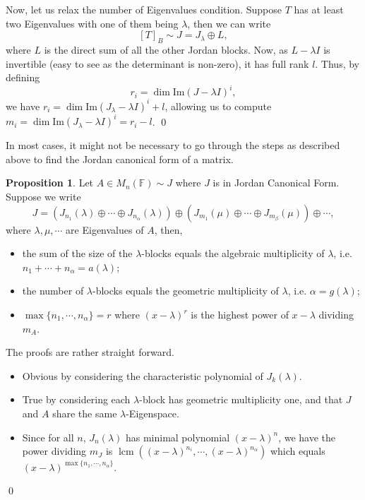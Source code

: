 \documentclass[
]{article}
\theoremstyle{definition}
\newtheorem{prop}{Proposition}[section]
\theoremstyle{definition}
\begin{document}
Now, let us relax the number of Eigenvalues condition. Suppose \(T\) has
at least two Eigenvalues with one of them being \(\lambda\), then we can
write \[[T]_B \sim J = J_\lambda \oplus L,\] where \(L\) is the direct
sum of all the other Jordan blocks. Now, as \(L - \lambda I\) is
invertible (easy to see as the determinant is non-zero), it has full
rank \(l\). Thus, by defining \[r_i = \dim \text{Im}(J - \lambda I)^i,\]
we have \(r_i = \dim \text{Im}(J_\lambda - \lambda I)^i + l\), allowing
us to compute
\(m_i = \dim \text{Im}(J_\lambda - \lambda I)^i = r_i - l\). \qed

In most cases, it might not be necessary to go through the steps as
described above to find the Jordan canonical form of a matrix.

\begin{prop}
  Let \(A \in M_n(\mathbb{F}) \sim J\) where \(J\) is in Jordan Canonical Form. 
  Suppose we write 
  \[J = (J_{n_1}(\lambda) \oplus \cdots \oplus J_{n_\alpha}(\lambda)) \oplus 
    (J_{m_1}(\mu) \oplus \cdots \oplus J_{m_\beta}(\mu)) \oplus \cdots,\]
  where \(\lambda, \mu, \cdots\) are Eigenvalues of \(A\), then,
  \begin{itemize}
    \item the sum of the size of the \(\lambda\)-blocks equals the algebraic 
    multiplicity of \(\lambda\), i.e. \(n_1 + \cdots + n_\alpha = a(\lambda)\);
    \item the number of \(\lambda\)-blocks equals the geometric multiplicity of 
    \(\lambda\), i.e. \(\alpha = g(\lambda)\);
    \item \(\max \{n_1, \cdots, n_\alpha\} = r\) where \((x - \lambda)^r\) is the 
    highest power of \(x - \lambda\) dividing \(m_A\).
  \end{itemize}
\end{prop}
\proof

The proofs are rather straight forward.

\begin{itemize}
    \item Obvious by considering the characteristic polynomial of \(J_k(\lambda)\).
    \item True by considering each \(\lambda\)-block has geometric multiplicity one, 
      and that \(J\) and \(A\) share the same \(\lambda\)-Eigenspace.
    \item Since for all \(n\), \(J_n(\lambda)\) has minimal polynomial 
    \((x - \lambda)^n\), we have the power dividing \(m_J\) is 
    \(\mathop{\mathrm{lcm}}((x - \lambda)^{n_i}, \cdots, (x - \lambda)^{n_\alpha})\) which equals 
    \((x - \lambda)^{\max \{n_1, \cdots, n_\alpha\}}\).
  \end{itemize}
\qed
\end{document}
